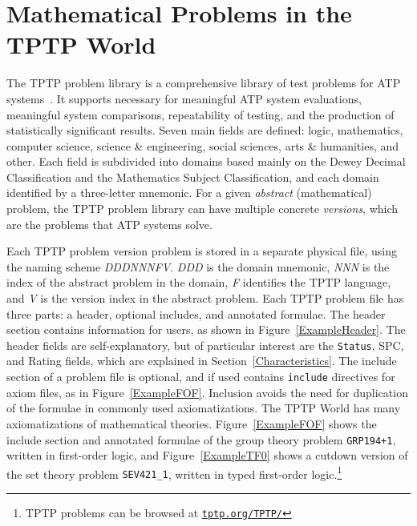\documentclass[runningheads]{llncs}
\begin{document}
\section{Mathematical Problems in the TPTP World}
\label{TPTP}

The TPTP problem library is a comprehensive library of test problems for ATP systems~\cite{Sut09}.
It supports necessary for meaningful ATP system evaluations, meaningful system comparisons, 
repeatability of testing, and the production of statistically significant results. 
Seven main fields are defined: logic, mathematics, computer science, science \& engineering, 
social sciences, arts \& humanities, and other. 
Each field is subdivided into domains based mainly on the Dewey Decimal Classification and the 
Mathematics Subject Classification, and each domain identified by a three-letter mnemonic.
For a given {\em abstract} (mathematical) problem, the TPTP problem library can have multiple 
concrete {\em versions}, which are the problems that ATP systems solve. 

Each TPTP problem version problem is stored in a separate physical file, using the naming scheme 
{\em DDDNNNFV}.
{\em DDD} is the domain mnemonic, {\em NNN} is the index of the abstract problem in the domain,
{\em F} identifies the TPTP language, and {\em V} is the version index in the abstract problem.
Each TPTP problem file has three parts: a header, optional includes, and annotated formulae.
The header section contains information for users, as shown in Figure~\ref{ExampleHeader}.
The header fields are self-explanatory, but of particular interest are the {\tt Status}, SPC,
and Rating fields, which are explained in Section~\ref{Characteristics}.
The include section of a problem file is optional, and if used contains {\tt include} directives 
for axiom files, as in Figure~\ref{ExampleFOF}.
Inclusion avoids the need for duplication of the formulae in commonly used axiomatizations.
The TPTP World has many axiomatizations of mathematical theories.
Figure~\ref{ExampleFOF} shows the include section and annotated formulae of the group theory 
problem {\tt GRP194+1}, written in first-order logic, and Figure~\ref{ExampleTF0} shows a cutdown 
version of the set theory problem {\tt SEV421\_1}, written in typed first-order logic.\footnote{%
TPTP problems can be browsed at \href{https://tptp.org/TPTP/}{{\tt tptp.org/TPTP/}}}
\end{document}
